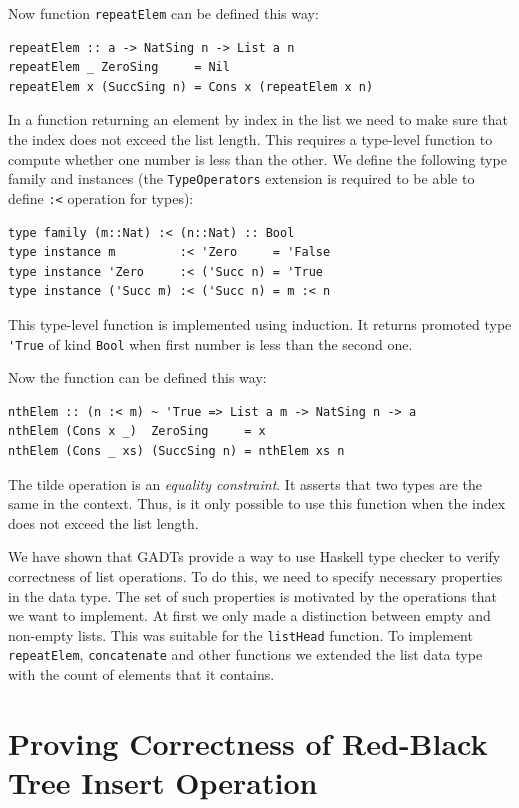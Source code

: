 \documentclass{tmr}
\newcommand{\italic}[1]{\textit{#1}}
\begin{document}
Now function \verb|repeatElem| can be defined this way:

\begin{Verbatim}
repeatElem :: a -> NatSing n -> List a n
repeatElem _ ZeroSing     = Nil
repeatElem x (SuccSing n) = Cons x (repeatElem x n)
\end{Verbatim}

In a function returning an element by index in the list we need to make sure that the index does not exceed the list length. This requires a type-level function to compute whether one number is less than the other. We define the following type family and instances (the \verb|TypeOperators| extension is required to be able to define \verb|:<| operation for types):

\begin{Verbatim}
type family (m::Nat) :< (n::Nat) :: Bool
type instance m         :< 'Zero     = 'False
type instance 'Zero     :< ('Succ n) = 'True
type instance ('Succ m) :< ('Succ n) = m :< n
\end{Verbatim}

This type-level function is implemented using induction. It returns promoted type \verb|'True| of kind \verb|Bool| when first number is less than the second one.

Now the function can be defined this way:

\begin{Verbatim}
nthElem :: (n :< m) ~ 'True => List a m -> NatSing n -> a
nthElem (Cons x _)  ZeroSing     = x
nthElem (Cons _ xs) (SuccSing n) = nthElem xs n
\end{Verbatim}

The tilde operation is an \italic{equality constraint}. It asserts that two types are the same in the context. Thus, is it only possible to use this function when the index does not exceed the list length.

We have shown that GADTs provide a way to use Haskell type checker to verify correctness of list operations. To do this, we need to specify necessary properties in the data type. The set of such properties is motivated by the operations that we want to implement. At first we only made a distinction between empty and non-empty lists. This was suitable for the \verb|listHead| function. To implement \verb|repeatElem|, \verb|concatenate| and other functions we extended the list data type with the count of elements that it contains.

\section{Proving Correctness of Red-Black Tree Insert Operation}
\label{sec:red_black}
\end{document}
